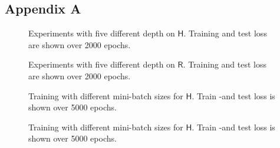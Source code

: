 \documentclass[12pt, a4paper]{article}
\newcommand{\hy}{\(\textsf{H}\)}
\newcommand{\rare}{\(\textsf{R}\)}
\begin{document}
\subsection{Appendix A}\label{Sec:AppendixA}
\begin{center}
	\begin{figure}[htbp!]
		\scalebox{.9}{}
		\scalebox{.9}{}
		\scalebox{.9}{}
		\scalebox{.9}{}
		\scalebox{.9}{}
		\caption{Experiments with five different depth on \hy. Training and test loss are shown over 2000 epochs.}
		\label{Fig:Depth Hydro}
	\end{figure}
\end{center}
\begin{center}
	\begin{figure}[htbp!]
		\scalebox{.9}{}
		\scalebox{.9}{}
		\scalebox{.9}{}
		\scalebox{.9}{}
		\scalebox{.9}{}
		\caption{Experiments with five different depth on \rare. Training and test loss are shown over 2000 epochs.}
		\label{Fig:Depth Rare}
	\end{figure}
\end{center}
\begin{center}
	\begin{figure}[htbp!]
		\scalebox{.9}{}
		\scalebox{.9}{}
		\scalebox{.9}{}
		\scalebox{.9}{}
		\scalebox{.9}{}
		\scalebox{.9}{}
		\caption{Training with different mini-batch sizes for \hy. Train -and test loss is shown over 5000 epochs.}
		\label{Fig:Batch Hy}
	\end{figure}
\end{center}
\begin{center}
	\begin{figure}[htbp!]\ContinuedFloat
		\scalebox{.9}{}
		\scalebox{.9}{}
		\caption{Training with different mini-batch sizes for \hy. Train -and test loss is shown over 5000 epochs.}
		\label{}
	\end{figure}
\end{center}
\end{document}
